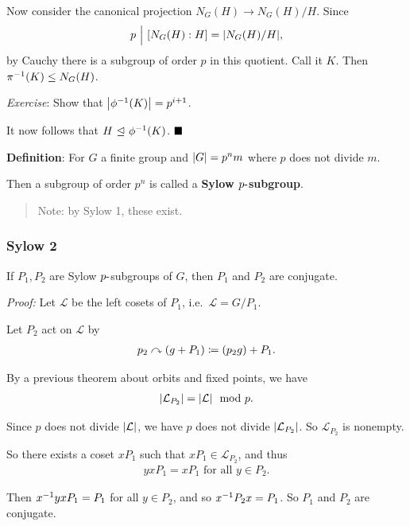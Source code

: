 Now consider the canonical projection \(N_G(H) \to N_G(H) /H\). Since
\begin{align*}
p {~\Bigm| ~} [N_G(H) : H] = {\left\lvert {N_G(H)/ H} \right\rvert}
,\end{align*} by Cauchy there is a subgroup of order \(p\) in this
quotient. Call it \(K\). Then \(\pi^{-1}(K) \leq N_G(H)\).

\emph{Exercise}: Show that \({\left\lvert {\phi^{-1}(K)} \right\rvert} = p^{i+1}\).

It now follows that \(H {~\trianglelefteq~} \phi^{-1}(K)\). \(\qed\)

\textbf{Definition}: For \(G\) a finite group and \({\left\lvert {G} \right\rvert} = p^n m\)
where \(p\) does not divide \(m\).

Then a subgroup of order \(p^n\) is called a \textbf{Sylow
\(p{\hbox{-}}\)subgroup}.

\begin{quote}
Note: by Sylow 1, these exist.
\end{quote}

\hypertarget{sylow-2}{%
\subsubsection{Sylow 2}\label{sylow-2}}

If \(P_1, P_2\) are Sylow \(p{\hbox{-}}\)subgroups of \(G\), then \(P_1\) and
\(P_2\) are conjugate.

\emph{Proof:} Let \(\mathcal L\) be the left cosets of \(P_1\),
i.e.~\(\mathcal L = G/P_1\).

Let \(P_2\) act on \(\mathcal L\) by
\begin{align*}
p_2 \curvearrowright (g + P_1) \coloneqq (p_2g) + P_1
.\end{align*}

By a previous theorem about orbits and fixed points, we have
\begin{align*}
{\left\lvert {\mathcal L_{P_2}} \right\rvert} = {\left\lvert {\mathcal L} \right\rvert} \mod p.
\end{align*}

Since \(p\) does not divide \({\left\lvert {\mathcal L} \right\rvert}\), we have \(p\) does not
divide \({\left\lvert {\mathcal L_{P_2}} \right\rvert}\). So \(\mathcal L_{P_2}\) is nonempty.

So there exists a coset \(xP_1\) such that
\(xP_1 \in \mathcal L_{P_2}\), and thus
\begin{align*}
yxP_1 = xP_1 \text{ for all } y\in P_2
.\end{align*}

Then \(x^{-1} y x P_1 = P_1\) for all \(y\in P_2\), and so
\(x^{-1} P_2 x = P_1\). So \(P_1\) and \(P_2\) are conjugate.

